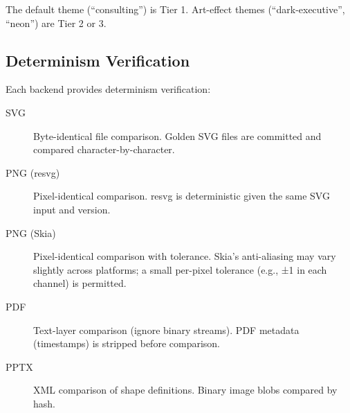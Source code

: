 The default theme (``consulting'') is Tier 1. Art-effect themes (``dark-executive'', ``neon'') are Tier 2 or 3.

\subsection{Determinism Verification}

Each backend provides determinism verification:

\begin{description}
  \item[SVG] Byte-identical file comparison. Golden SVG files are committed and compared character-by-character.
  
  \item[PNG (resvg)] Pixel-identical comparison. resvg is deterministic given the same SVG input and version.
  
  \item[PNG (Skia)] Pixel-identical comparison with tolerance. Skia's anti-aliasing may vary slightly across platforms; a small per-pixel tolerance (e.g., ±1 in each channel) is permitted.
  
  \item[PDF] Text-layer comparison (ignore binary streams). PDF metadata (timestamps) is stripped before comparison.
  
  \item[PPTX] XML comparison of shape definitions. Binary image blobs compared by hash.
\end{description}
